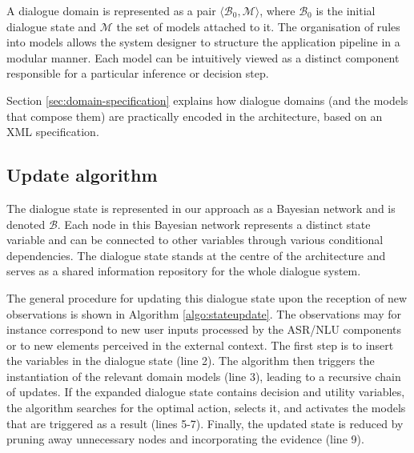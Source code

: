 A dialogue domain is represented as a pair $\langle \mathcal{B}_0, \mathcal{M} \rangle$, where $\mathcal{B}_0$ is the initial dialogue state  and $\mathcal{M}$ the set of models attached to it. The organisation of rules into models allows the system designer to structure the application pipeline in a modular manner. Each model can be intuitively viewed as a distinct component responsible for a particular inference or decision step. 

Section \ref{sec:domain-specification} explains how dialogue domains (and the models that compose them) are practically encoded in the \opendial{} architecture, based on an XML specification. 

\subsection{Update algorithm} 


The dialogue state is represented in our approach as a Bayesian network and is denoted $\mathcal{B}$. Each node in this Bayesian network represents a distinct state variable and can be connected to other variables through various conditional dependencies. The dialogue state stands at the centre of the architecture and serves as a shared information repository for the whole dialogue system. 

The general procedure for updating this dialogue state upon the reception of new observations is shown in Algorithm \ref{algo:stateupdate}. The observations may for instance correspond to new user inputs processed by the ASR/NLU components or to new elements perceived in the external context. The first step is to insert the variables in the dialogue state (line 2). The algorithm then triggers the instantiation of the relevant domain models (line 3), leading to a recursive chain of updates.  If the expanded dialogue state contains decision and utility variables, the algorithm searches for the optimal action, selects it, and activates the models that are triggered as a result  (lines 5-7). Finally, the updated state is reduced by pruning away unnecessary nodes and incorporating the evidence (line 9). 

